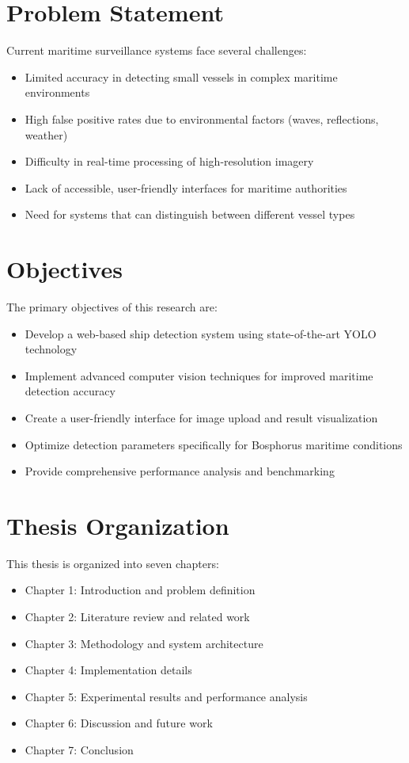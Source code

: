 \documentclass[12pt,a4paper]{report}
\begin{document}
\section{Problem Statement}
Current maritime surveillance systems face several challenges:
\begin{itemize}
    \item Limited accuracy in detecting small vessels in complex maritime environments
    \item High false positive rates due to environmental factors (waves, reflections, weather)
    \item Difficulty in real-time processing of high-resolution imagery
    \item Lack of accessible, user-friendly interfaces for maritime authorities
    \item Need for systems that can distinguish between different vessel types
\end{itemize}

\section{Objectives}
The primary objectives of this research are:
\begin{itemize}
    \item Develop a web-based ship detection system using state-of-the-art YOLO technology
    \item Implement advanced computer vision techniques for improved maritime detection accuracy
    \item Create a user-friendly interface for image upload and result visualization
    \item Optimize detection parameters specifically for Bosphorus maritime conditions
    \item Provide comprehensive performance analysis and benchmarking
\end{itemize}

\section{Thesis Organization}
This thesis is organized into seven chapters:
\begin{itemize}
    \item Chapter 1: Introduction and problem definition
    \item Chapter 2: Literature review and related work
    \item Chapter 3: Methodology and system architecture
    \item Chapter 4: Implementation details
    \item Chapter 5: Experimental results and performance analysis
    \item Chapter 6: Discussion and future work
    \item Chapter 7: Conclusion
\end{itemize}
\end{document}
